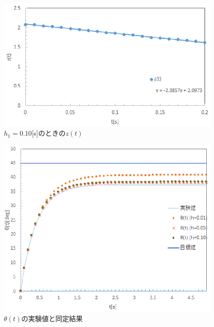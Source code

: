 \documentclass[11pt,a4paper]{jsarticle}
\begin{document}
\begin{figure}[htb]
 \begin{center}
  \includegraphics[scale = 1]{./picture/graph3_re.eps}
 \end{center}
 \caption{$h_1 = 0.10$[s]のときの$z(t)$}
\end{figure}

\begin{figure}[htb]
 \begin{center}
  \includegraphics[scale = 1]{./picture/graph4_re.eps}
 \end{center}
 \caption{$\theta(t)$の実験値と同定結果}
\end{figure}

\newpage
\thispagestyle{fancy}
\cfoot{}


\newpage
\thispagestyle{fancy}
\cfoot{}
\end{document}

